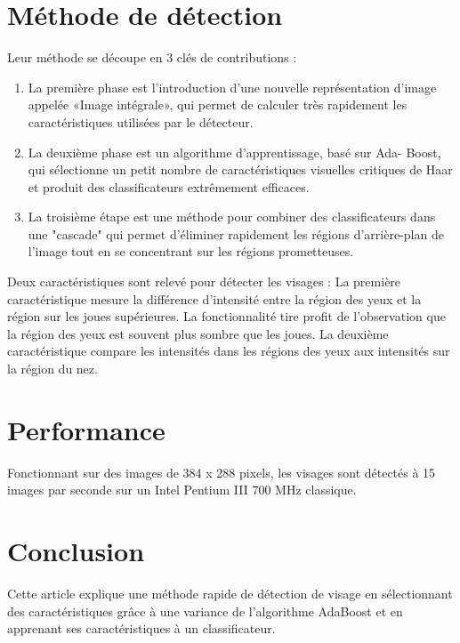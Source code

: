 \documentclass[11pt]{report}
\begin{document}
\section{Méthode de détection}
Leur méthode se découpe en 3 clés de contributions :
\begin{enumerate}
	\item La première phase est l’introduction d’une nouvelle représentation
d’image appelée «Image intégrale», qui permet de calculer très rapidement
les caractéristiques utilisées par le détecteur.
	\item La deuxième phase est un algorithme d’apprentissage, basé sur Ada-
Boost, qui sélectionne un petit nombre de caractéristiques visuelles
critiques de Haar et produit des classificateurs extrêmement efficaces.
	\item La troisième étape est une méthode pour combiner des classificateurs
dans une "cascade" qui permet d’éliminer rapidement les régions
d’arrière-plan de l’image tout en se concentrant sur les régions
prometteuses.
\end{enumerate}
Deux caractéristiques sont relevé pour détecter les visages : La première
caractéristique mesure la différence d’intensité entre la région des yeux et la
région sur les joues supérieures. La fonctionnalité tire profit de l’observation
que la région des yeux est souvent plus sombre que les joues. La deuxième
caractéristique compare les intensités dans les régions des yeux aux intensités
sur la région du nez.

\section{Performance}
Fonctionnant sur des images de 384 x 288 pixels, les visages sont détectés
à 15 images par seconde sur un Intel Pentium III 700 MHz classique.

\section{Conclusion}
Cette article explique une méthode rapide de détection de visage en sélectionnant
des caractéristiques grâce à une variance de l’algorithme AdaBoost
et en apprenant ses caractéristiques à un classificateur.
\end{document}
